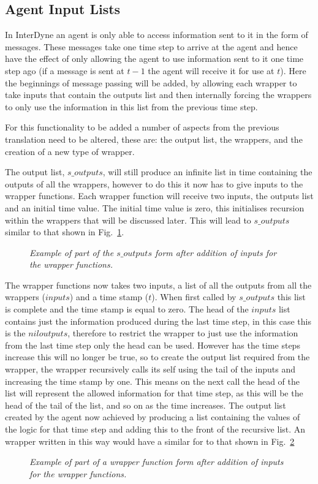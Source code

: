 \documentclass{article}
\begin{document}
\subsection{Agent Input Lists}
In InterDyne an agent is only able to access information sent to it in the form of messages. These messages take one time step to arrive at the agent and hence have the effect of only allowing the agent to use information sent to it one time step ago (if a message is sent at $t-1$ the agent will receive it for use at $t$). Here the beginnings of message passing will be added, by allowing each wrapper to take inputs that contain the outputs list and then internally forcing the wrappers to only use the information in this list from the previous time step. 

For this functionality to be added a number of aspects from the previous translation need to be altered, these are: the output list, the wrappers, and the creation of a new type of wrapper.  

The output list, $s\_outputs$, will still produce an infinite list in time containing the outputs of all the wrappers, however to do this it now has to give inputs to the wrapper functions. Each wrapper function will receive two inputs, the outputs list and an initial time value. The initial time value is zero, this initialises recursion within the wrappers that will be discussed later.  This will lead to $s\_outputs$ similar to that shown in Fig.~\ref{fig:souts4}.
\begin{figure}[H]
	\centering
	
	\caption{\it Example of part of the $s\_outputs$ form after addition of inputs for the wrapper functions.}
	\label{fig:souts4}
\end{figure} 


The wrapper functions now takes two inputs, a list of all the outputs from all the wrappers ($inputs$) and a time stamp ($t$). When first called by $s\_outputs$ this list is complete and the time stamp is equal to zero. The head of the $inputs$ list contains just the information produced during the last time step, in this case this is the $niloutputs$, therefore to restrict the wrapper to just use the information from the last time step only the head can be used. However has the time steps increase this will no longer be true, so to create the output list required from the wrapper, the wrapper recursively calls its self using the tail of the inputs and increasing the time stamp by one. This means on the next call the head of the list will represent the allowed information for that time step, as this will be the head of the tail of the list, and so on as the time increases. The output list created by the agent now achieved by producing a list containing the values of the logic for that time step and adding this to the front of the recursive list. An wrapper written in this way would have a similar for to that shown in Fig.~\ref{fig:wrap4}
\begin{figure}[H]
	\centering
	
	\caption{\it Example of part of a wrapper function form after addition of inputs for the wrapper functions.}
	\label{fig:wrap4}
\end{figure} 
\end{document}
